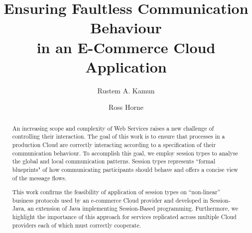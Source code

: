 \documentclass{llncs}
\begin{document}
%
\title{Ensuring Faultless Communication Behaviour\\
       in an E-Commerce Cloud Application}



%
\author{
	Rustem A. Kamun \and Ross Horne
}





\maketitle

\begin{abstract}
  An increasing scope and complexity of Web Services raises a new challenge of controlling their interaction. The goal of this work is to ensure that processes in a production Cloud are correctly interacting according to a specification of their communication behaviour. To accomplish this goal, we employ session types to analyse the global and local communication patterns. Session types represents ``formal blueprints" of how communicating participants should behave and offers a concise view of the message flows.
  
  This work confirms the feasibility of application of session types on ``non-linear'' business protocols used by an e-commerce Cloud provider and developed in Session-Java, an extension of Java implementing Session-Based programming. Furthermore, we highlight the importance of this approach for services replicated across multiple Cloud providers each of which must correctly cooperate.
\end{abstract}
\end{document}
